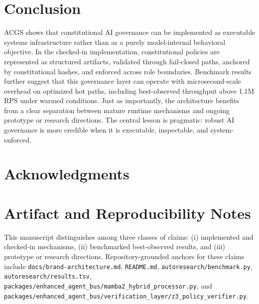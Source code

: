 \documentclass[11pt]{article}
\begin{document}
\section{Conclusion}
ACGS shows that constitutional AI governance can be implemented as executable systems infrastructure rather than as a purely model-internal behavioral objective. In the checked-in implementation, constitutional policies are represented as structured artifacts, validated through fail-closed paths, anchored by constitutional hashes, and enforced across role boundaries. Benchmark results further suggest that this governance layer can operate with microsecond-scale overhead on optimized hot paths, including best-observed throughput above 1.1M RPS under warmed conditions. Just as importantly, the architecture benefits from a clear separation between mature runtime mechanisms and ongoing prototype or research directions. The central lesson is pragmatic: robust AI governance is more credible when it is executable, inspectable, and system-enforced.

\section*{Acknowledgments}

\section*{Artifact and Reproducibility Notes}
This manuscript distinguishes among three classes of claims: (i) implemented and checked-in mechanisms, (ii) benchmarked best-observed results, and (iii) prototype or research directions. Repository-grounded anchors for these claims include \texttt{docs/brand-architecture.md}, \texttt{README.md}, \texttt{autoresearch/benchmark.py}, \texttt{autoresearch/results.tsv}, \texttt{packages/enhanced\_agent\_bus/mamba2\_hybrid\_processor.py}, and \texttt{packages/enhanced\_agent\_bus/verification\_layer/z3\_policy\_verifier.py}.


\nocite{acgsrepo}

\end{document}
